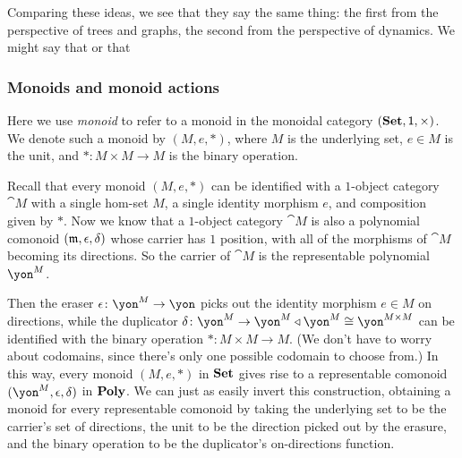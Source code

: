 \documentclass[Book-Poly]{subfiles}
\begin{document}
Comparing these ideas, we see that they say the same thing: the first from the perspective of trees and graphs, the second from the perspective of dynamics.
We might say that
or that

\subsubsection{Monoids and monoid actions}

Here we use \emph{monoid} to refer to a monoid in the monoidal category $(\mathbf{Set},\textsf{1},\times)$.
We denote such a monoid by $(M,e,*)$, where $M$ is the underlying set, $e\in M$ is the unit, and $*\colon M\times M\to M$ is the binary operation.

\begin{example}\label{ex.monoids}
Recall that every monoid $(M,e,*)$ can be identified with a $1$-object category $\cat{M}$ with a single hom-set $M$, a single identity morphism $e$, and composition given by $*$.
Now we know that a $1$-object category $\cat{M}$ is also a polynomial comonoid $(\mathfrak{m},\epsilon,\delta)$ whose carrier has $1$ position, with all of the morphisms of $\cat{M}$ becoming its directions.
So the carrier of $\cat{M}$ is the representable polynomial $\yon^M$.

Then the eraser $\epsilon\colon\yon^M\to\yon$ picks out the identity morphism $e\in M$ on directions, while the duplicator $\delta\colon\yon^M\to\yon^M\tri\yon^M\iso\yon^{M\times M}$ can be identified with the binary operation $*\colon M\times M\to M$.
(We don't have to worry about codomains, since there's only one possible codomain to choose from.)
In this way, every monoid $(M,e,*)$ in $\mathbf{Set}$ gives rise to a representable comonoid $(\yon^M,\epsilon,\delta)$ in $\mathbf{Poly}$.
We can just as easily invert this construction, obtaining a monoid for every representable comonoid by taking the underlying set to be the carrier's set of directions, the unit to be the direction picked out by the erasure, and the binary operation to be the duplicator's on-directions function.


\end{example}
\end{document}
